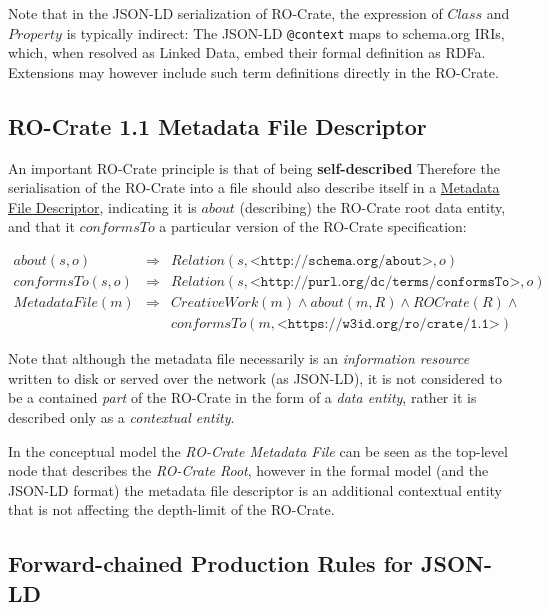 Note that in the JSON-LD serialization of RO-Crate, the expression of $Class$ and $Property$ is typically indirect: The JSON-LD \texttt{@context} maps to schema.org IRIs, which, when resolved as Linked Data, embed their formal definition as RDFa. Extensions may however include such term definitions directly in the RO-Crate.

\subsection{RO-Crate 1.1 Metadata File Descriptor}

An important RO-Crate principle is that of being \textbf{self-described} Therefore the serialisation of the RO-Crate into a file should also describe itself in a \href{https://www.researchobject.org/ro-crate/1.1/root-data-entity.html#ro-crate-metadata-file-descriptor}{Metadata File Descriptor}, indicating it is $about$ (describing) the RO-Crate root data entity, and that it $conformsTo$ a particular version of the RO-Crate specification:

\begin{eqnarray*}
about(s,o)      & \Rightarrow & Relation(s, \texttt{<http://schema.org/about>}, o)   \\
conformsTo(s,o) & \Rightarrow & Relation(s, \texttt{<http://purl.org/dc/terms/conformsTo>}, o)   \\
MetadataFile(m) & \Rightarrow & CreativeWork(m) \land about(m,R) ∧ ROCrate(R) \land    \\
                &             & conformsTo(m, \texttt{<https://w3id.org/ro/crate/1.1>})
\end{eqnarray*}

Note that although the metadata file necessarily is an \emph{information resource} written to disk or served over the network (as JSON-LD), it is not considered to be a contained \emph{part} of the RO-Crate in the form of a \emph{data entity}, rather it is described only as a \emph{contextual entity}.

In the conceptual model the \emph{RO-Crate Metadata File} can be seen as the top-level node that describes the \emph{RO-Crate Root}, however in the formal model (and the JSON-LD format) the metadata file descriptor is an additional contextual entity that is not affecting the depth-limit of the RO-Crate.

\subsection{Forward-chained Production Rules for JSON-LD}

